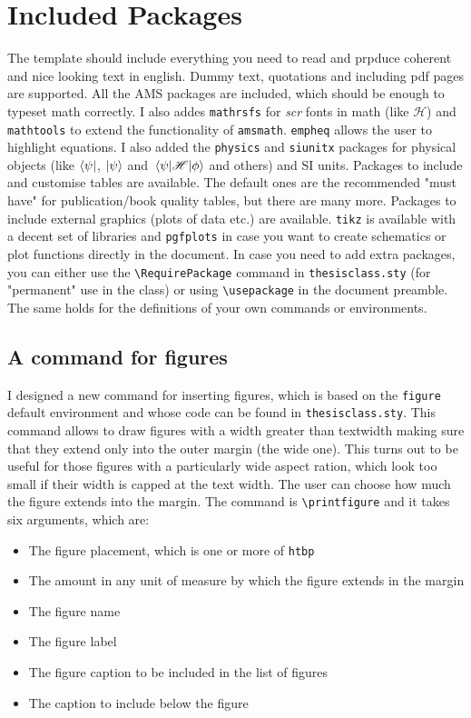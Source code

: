 \section{Included Packages}

The template should include everything you need to read and prpduce coherent and nice looking text in english. Dummy text, quotations and including pdf pages are supported. All the AMS packages are included, which should be enough to typeset math correctly. I also addes \texttt{mathrsfs} for \textit{scr} fonts in math (like $\mathscr{H}$) and \texttt{mathtools} to extend the functionality of \texttt{amsmath}. \texttt{empheq} allows the user to highlight equations. I also added the \texttt{physics} and \texttt{siunitx} packages for physical objects (like $\bra{\psi}$, $\ket{\psi}$ and $\mel{\psi}{\mathscr{H}}{\phi}$ and others) and SI units. Packages to include and customise tables are available. The default ones are the recommended "must have" for publication/book quality tables, but there are many more. Packages to include external graphics (plots of data etc.) are available. \texttt{tikz} is available with a decent set of libraries and \texttt{pgfplots} in case you want to create schematics or plot functions directly in the document. In case you need to add extra packages, you can either use the \texttt{{\textbackslash}RequirePackage} command in \texttt{thesisclass.sty} (for "permanent" use in the class) or using \texttt{{\textbackslash}usepackage} in the document preamble. The same holds for the definitions of your own commands or environments. 

\subsection{A command for figures}

I designed a new command for inserting figures, which is based on the \texttt{figure} default environment and whose code can be found in \texttt{thesisclass.sty}. This command allows to draw figures with a width greater than textwidth making sure that they extend only into the outer margin (the wide one). This turns out to be useful for those figures with a particularly wide aspect ration, which look too small if their width is capped at the text width. The user can choose how much the figure extends into the margin. The command is \texttt{{\textbackslash}printfigure} and it takes six arguments, which are:

\begin{itemize}
	\item  The figure placement, which is one or more of \texttt{htbp}
	\item The amount in any unit of measure by which the figure extends in the margin
	\item The figure name
	\item The figure label
	\item The figure caption to be included in the list of figures
	\item The caption to include below the figure
\end{itemize}

